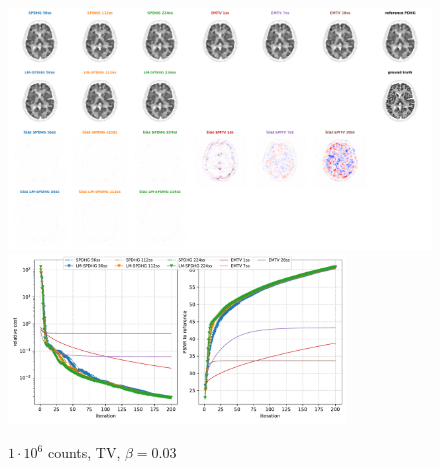 \begin{figure}
  \centering
    \includegraphics[width=1.0\textwidth]{./figs/brain2d_counts_1.0E+06_seed_1_beta_3.0E-02_prior_TV_niter_ref_20000_fwhm_4.5_4.5_niter_200.png}
    \includegraphics[width=0.8\textwidth]{./figs/brain2d_counts_1.0E+06_seed_1_beta_3.0E-02_prior_TV_niter_ref_20000_fwhm_4.5_4.5_niter_200_metrics.pdf}
  \caption{$1\cdot10^6$ counts, TV, $\beta = 0.03$}
  \label{fig:metrics}
\end{figure}


